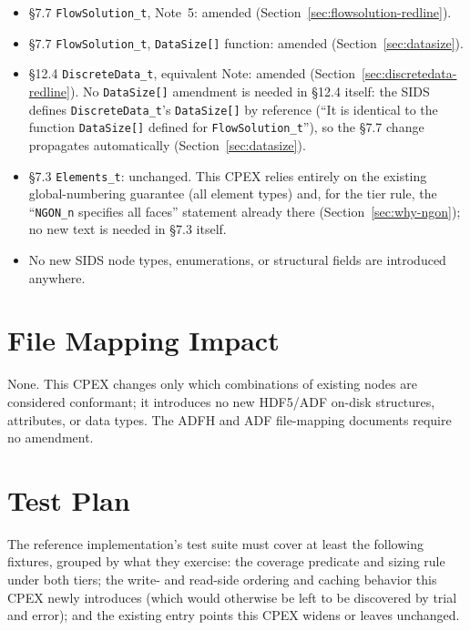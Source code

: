 \documentclass[11pt,letterpaper]{article}
\begin{document}
\begin{itemize}[leftmargin=2em]
\item \S7.7 \texttt{FlowSolution\_t}, Note~5: amended
  (Section~\ref{sec:flowsolution-redline}).
\item \S7.7 \texttt{FlowSolution\_t}, \texttt{DataSize[]} function:
  amended (Section~\ref{sec:datasize}).
\item \S12.4 \texttt{DiscreteData\_t}, equivalent Note: amended
  (Section~\ref{sec:discretedata-redline}). No \texttt{DataSize[]}
  amendment is needed in \S12.4 itself: the SIDS defines
  \texttt{DiscreteData\_t}'s \texttt{DataSize[]} by reference (``It is
  identical to the function \texttt{DataSize[]} defined for
  \texttt{FlowSolution\_t}''), so the \S7.7 change propagates
  automatically (Section~\ref{sec:datasize}).
\item \S7.3 \texttt{Elements\_t}: unchanged. This CPEX relies entirely
  on the existing global-numbering guarantee (all element types) and, for
  the tier rule, the ``\texttt{NGON\_n} specifies all faces'' statement
  already there (Section~\ref{sec:why-ngon}); no new text is needed in
  \S7.3 itself.
\item No new SIDS node types, enumerations, or structural fields are
  introduced anywhere.
\end{itemize}

\section{File Mapping Impact}

None. This CPEX changes only which combinations of existing nodes are
considered conformant; it introduces no new HDF5/ADF on-disk structures,
attributes, or data types. The ADFH and ADF file-mapping documents
require no amendment.

\section{Test Plan}
\label{sec:test-plan}

The reference implementation's test suite must cover at least the
following fixtures, grouped by what they exercise: the coverage
predicate and sizing rule under both tiers; the write- and read-side
ordering and caching behavior this CPEX newly introduces (which would
otherwise be left to be discovered by trial and error); and the
existing entry points this CPEX widens or leaves unchanged.
\end{document}
